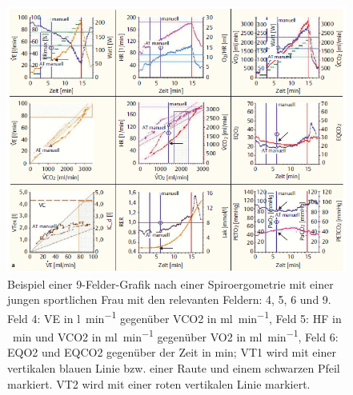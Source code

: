 \begin{figure}[H]
	\centering
	\includegraphics[width=\textwidth]{Bilder/9fieldcomplex.png}
	\caption[Beispielhafte 9-Felder-Grafik nach einer Spiroergometrie]{Beispiel einer 9-Felder-Grafik nach einer Spiroergometrie mit einer jungen sportlichen Frau mit den relevanten Feldern: 4, 5, 6 und 9.\\
	Feld 4: \acs{VE} in \si{\litre\per\minute} gegenüber \acs{VCO2} in \si{\milli\litre\per\minute}, Feld 5: \acs{HF} in \si{\per\minute} und \acs{VCO2} in \si{\milli\litre\per\minute} gegenüber \acs{VO2} in \si{\milli\litre\per\minute}, Feld 6: \acs{EQO2} und \acs{EQCO2} gegenüber der Zeit in \si{\minute}; VT1 wird mit einer vertikalen blauen Linie bzw. einer Raute und einem schwarzen Pfeil markiert. VT2 wird mit einer roten vertikalen Linie markiert.~\cite{Kroidl.2015}}
	\label{pic:pic2}
\end{figure}
%
